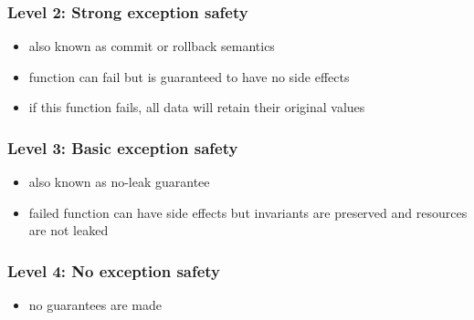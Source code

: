 \begin{frame}[fragile]
    \frametitle{Level 2: Strong exception safety}
    \begin{itemize}
        \item also known as commit or rollback semantics
        \item function can fail but is guaranteed to have no side effects
        \item if this function fails, all data will retain their original values
    \end{itemize}
\end{frame}

\begin{frame}[fragile]
    \frametitle{Level 3: Basic exception safety}
    \begin{itemize}
        \item also known as no-leak guarantee
        \item failed function can have side effects but invariants are preserved and resources are not leaked
    \end{itemize}
\end{frame}

\begin{frame}[fragile]
    \frametitle{Level 4: No exception safety}
    \begin{itemize}
        \item no guarantees are made \texttrademark
    \end{itemize}
\end{frame}


